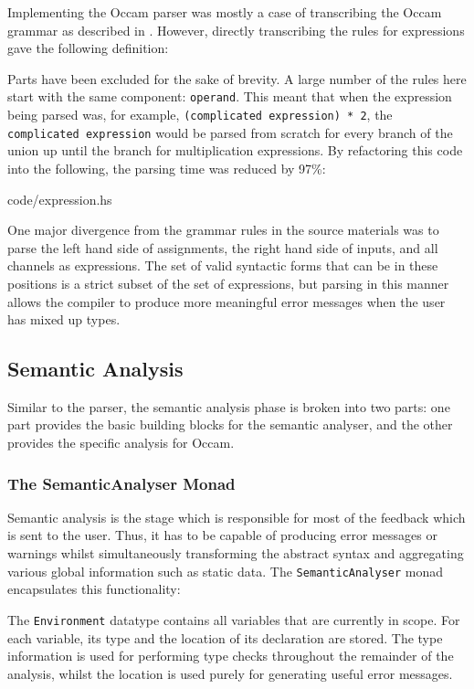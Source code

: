 Implementing the Occam parser was mostly a case of transcribing the Occam
grammar as described in \cite{jones}. However, directly transcribing the rules
for expressions gave the following definition:

Parts have been excluded for the sake of brevity. A large number of the rules
here start with the same component: \texttt{operand}. This meant that when the
expression being parsed was, for example, \texttt{(complicated expression) * 2},
the \texttt{complicated expression} would be parsed from scratch for every
branch of the union up until the branch for multiplication expressions. By
refactoring this code into the following, the parsing time was reduced by 97\%:

    {code/expression.hs}

One major divergence from the grammar rules in the source materials was to parse
the left hand side of assignments, the right hand side of inputs, and all
channels as expressions. The set of valid syntactic forms that can be in these
positions is a strict subset of the set of expressions, but parsing in this
manner allows the compiler to produce more meaningful error messages when the
user has mixed up types.

\subsection{Semantic Analysis}

Similar to the parser, the semantic analysis phase is broken into two parts: one
part provides the basic building blocks for the semantic analyser, and the other
provides the specific analysis for Occam.

\subsubsection{The SemanticAnalyser Monad}

Semantic analysis is the stage which is responsible for most of the feedback
which is sent to the user. Thus, it has to be capable of producing error
messages or warnings whilst simultaneously transforming the abstract syntax and
aggregating various global information such as static data. The
\texttt{SemanticAnalyser} monad encapsulates this functionality:

The \texttt{Environment} datatype contains all variables that are currently in
scope. For each variable, its type and the location of its declaration are
stored. The type information is used for performing type checks throughout the
remainder of the analysis, whilst the location is used purely for generating
useful error messages.

